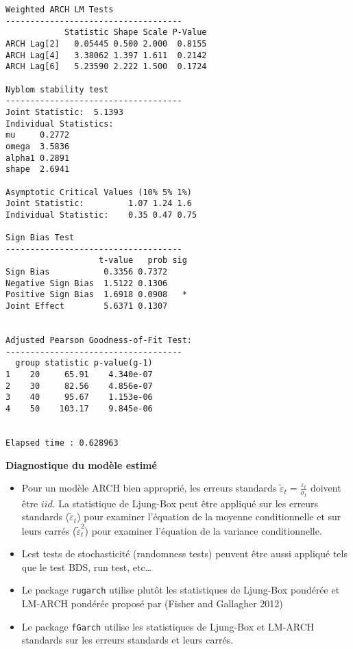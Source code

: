 \documentclass[
  ignorenonframetext,
]{beamer}
\begin{document}
\begin{frame}[fragile]
\begin{verbatim}
Weighted ARCH LM Tests
------------------------------------
            Statistic Shape Scale P-Value
ARCH Lag[2]   0.05445 0.500 2.000  0.8155
ARCH Lag[4]   3.38062 1.397 1.611  0.2142
ARCH Lag[6]   5.23590 2.222 1.500  0.1724

Nyblom stability test
------------------------------------
Joint Statistic:  5.1393
Individual Statistics:             
mu     0.2772
omega  3.5836
alpha1 0.2891
shape  2.6941

Asymptotic Critical Values (10% 5% 1%)
Joint Statistic:         1.07 1.24 1.6
Individual Statistic:    0.35 0.47 0.75

Sign Bias Test
------------------------------------
                   t-value   prob sig
Sign Bias           0.3356 0.7372    
Negative Sign Bias  1.5122 0.1306    
Positive Sign Bias  1.6918 0.0908   *
Joint Effect        5.6371 0.1307    


Adjusted Pearson Goodness-of-Fit Test:
------------------------------------
  group statistic p-value(g-1)
1    20     65.91    4.340e-07
2    30     82.56    4.856e-07
3    40     95.67    1.153e-06
4    50    103.17    9.845e-06


Elapsed time : 0.628963 
\end{verbatim}
\end{frame}

\begin{frame}[fragile]
\textbf{Diagnostique du modèle estimé}

\begin{itemize}[<+->]
\item
  Pour un modèle ARCH bien approprié, les erreurs standards
  \(\widetilde{\varepsilon}_t=\frac{\varepsilon_t}{\sigma_t}\) doivent
  être \(iid\). La statistique de Ljung-Box peut être appliqué sur les
  erreurs standards (\(\widetilde{\varepsilon}_t\)) pour examiner
  l'équation de la moyenne conditionnelle et sur leurs carrés
  (\(\widetilde{\varepsilon}_t^2\)) pour examiner l'équation de la
  variance conditionnelle.
\item
  Lest tests de stochasticité (randomness tests) peuvent être aussi
  appliqué tels que le test BDS, run test, etc\ldots{}
\item
  Le package \texttt{rugarch} utilise plutôt les statistiques de
  Ljung-Box pondérée et LM-ARCH pondérée proposé par (Fisher and
  Gallagher 2012)
\item
  Le package \texttt{fGarch} utilise les statistiques de Ljung-Box et
  LM-ARCH standards sur les erreurs standards et leurs carrés.
\end{itemize}
\end{frame}
\end{document}
